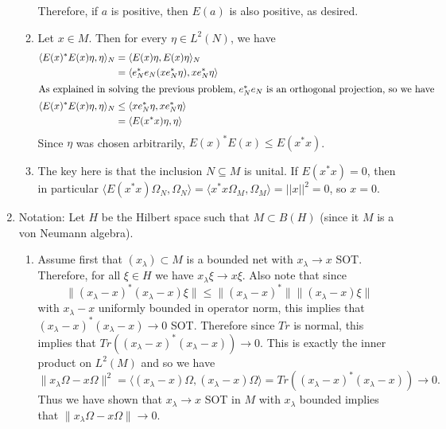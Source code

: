 \documentclass[a4paper,10pt]{report}
\newcommand{\ggen}[1]{\langle#1\rangle}
\newcommand{\norm}[1]{||#1||}
\begin{document}
\begin{enumerate}
\begin{enumerate}
				Therefore, if $a$ is positive, then $E(a)$ is also positive, as desired. 
			\item Let $x\in M$. Then for every $\eta\in L^2(N)$, we have 
				\begin{align*}
					\ggen{E(x)^*E(x)\eta,\eta}_N &= \ggen{E(x)\eta,E(x)\eta}_N\\
					&= \ggen{e_N^*e_N(xe_N^*\eta),xe_N^*\eta}\\
					\intertext{As explained in solving the previous problem, $e_N^*e_N$ is an orthogonal projection, so we have }
					\ggen{E(x)^*E(x)\eta,\eta}_N &\le \ggen{xe_N^*\eta,xe_N^*\eta}\\
					&= \ggen{E(x^*x)\eta,\eta}
				\end{align*}
				Since $\eta$ was chosen arbitrarily, $E(x)^*E(x)\le E(x^*x)$. 
			\item The key here is that the inclusion $N\subseteq M$ is unital. If $E(x^*x)=0$, then in particular $\ggen{E(x^*x)\Omega_N,\Omega_N}=\ggen{x^*x\Omega_M,\Omega_M}=\norm{x}^2=0$, so $x=0$. 
		\end{enumerate}
	\item
			Notation: Let $H$ be the Hilbert space such that $M\subset B(H)$ (since it $M$ is a von Neumann algebra).
		\begin{enumerate}
			\item Assume first that $(x_\lambda) \subset M$ is a bounded net with $x_\lambda \rightarrow x$ SOT.  Therefore, for all $\xi\in H$ we have $x_\lambda \xi \rightarrow x\xi$.  Also note that since $$\|(x_\lambda - x)^* (x_\lambda - x)\xi \| \leq \|(x_\lambda - x)^*\| \|(x_\lambda - x)\xi \|$$ with $x_\lambda - x$ uniformly bounded in operator norm, this implies that $(x_\lambda - x)^*(x_\lambda - x) \rightarrow 0$ SOT.  Therefore since $Tr$ is normal, this implies that $Tr((x_\lambda - x)^*(x_\lambda - x)) \rightarrow 0$.  This is exactly the inner product on $L^2(M)$ and so we have $$\|x_\lambda\Omega - x\Omega \|^2 =  \langle (x_\lambda - x)\Omega, (x_\lambda - x)\Omega \rangle = Tr((x_\lambda - x)^*(x_\lambda - x)) \rightarrow 0.$$ Thus we have shown that $x_\lambda \rightarrow x$ SOT in $M$ with $x_\lambda$ bounded implies that $\|x_\lambda\Omega - x\Omega \| \rightarrow 0$.
			\newline

\end{enumerate}
\end{enumerate}
\end{document}
